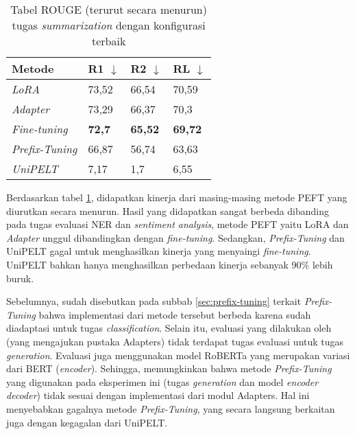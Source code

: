 \begin{table}[h]
    \centering
    \caption{Tabel ROUGE (terurut secara menurun) tugas \textit{summarization} dengan konfigurasi terbaik}
    \label{table:summarization-result-indosum-desc}
    \begin{tabular}{l|lll}
        \toprule
        \textbf{Metode} & \textbf{R1 $\downarrow$} & \textbf{R2 $\downarrow$} & \textbf{RL $\downarrow$} \\
        \midrule
        \textit{LoRA} & 73,52 & 66,54 & 70,59 \\
        \textit{Adapter} & 73,29 & 66,37 & 70,3 \\
        \textit{Fine-tuning} & \textbf{72,7} & \textbf{65,52} & \textbf{69,72} \\
        \textit{Prefix-Tuning} & 66,87 & 56,74 & 63,63 \\
        \textit{UniPELT} & 7,17 & 1,7 & 6,55 \\
        \bottomrule
    \end{tabular}
\end{table}

Berdasarkan tabel \ref{table:summarization-result-indosum-desc}, didapatkan kinerja dari masing-masing metode PEFT yang diurutkan secara menurun. Hasil yang didapatkan sangat berbeda dibanding pada tugas evaluasi NER dan \textit{sentiment analysis}, metode PEFT yaitu LoRA dan \textit{Adapter} unggul dibandingkan dengan \textit{fine-tuning}. Sedangkan, \textit{Prefix-Tuning} dan UniPELT gagal untuk menghasilkan kinerja yang menyaingi \textit{fine-tuning}. UniPELT bahkan hanya menghasilkan perbedaan kinerja sebanyak 90\% lebih buruk.

Sebelumnya, sudah disebutkan pada subbab \ref{sec:prefix-tuning} terkait \textit{Prefix-Tuning} bahwa implementasi dari metode tersebut berbeda karena sudah diadaptasi untuk tugas \textit{classification}. Selain itu, evaluasi yang dilakukan oleh \citeauthor{adapters} (yang mengajukan pustaka Adapters) tidak terdapat tugas evaluasi untuk tugas \textit{generation}. Evaluasi juga menggunakan model RoBERTa yang merupakan variasi dari BERT (\textit{encoder}). Sehingga, memungkinkan bahwa metode \textit{Prefix-Tuning} yang digunakan pada eksperimen ini (tugas \textit{generation} dan model \textit{encoder decoder}) tidak sesuai dengan implementasi dari modul Adapters. Hal ini menyebabkan gagalnya metode \textit{Prefix-Tuning}, yang secara langsung berkaitan juga dengan kegagalan dari UniPELT.
